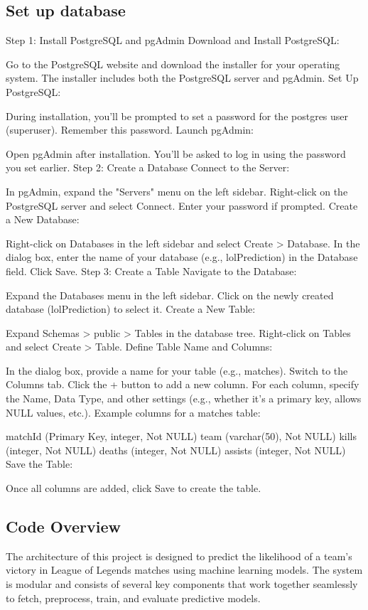 \documentclass[10pt,twocolumn]{article}
\begin{document}
\subsection{Set up database}
Step 1: Install PostgreSQL and pgAdmin
Download and Install PostgreSQL:

Go to the PostgreSQL website and download the installer for your operating system.
The installer includes both the PostgreSQL server and pgAdmin.
Set Up PostgreSQL:

During installation, you'll be prompted to set a password for the postgres user (superuser). Remember this password.
Launch pgAdmin:

Open pgAdmin after installation. You’ll be asked to log in using the password you set earlier.
Step 2: Create a Database
Connect to the Server:

In pgAdmin, expand the "Servers" menu on the left sidebar.
Right-click on the PostgreSQL server and select Connect. Enter your password if prompted.
Create a New Database:

Right-click on Databases in the left sidebar and select Create > Database.
In the dialog box, enter the name of your database (e.g., lolPrediction) in the Database field.
Click Save.
Step 3: Create a Table
Navigate to the Database:

Expand the Databases menu in the left sidebar.
Click on the newly created database (lolPrediction) to select it.
Create a New Table:

Expand Schemas > public > Tables in the database tree.
Right-click on Tables and select Create > Table.
Define Table Name and Columns:

In the dialog box, provide a name for your table (e.g., matches).
Switch to the Columns tab.
Click the + button to add a new column.
For each column, specify the Name, Data Type, and other settings (e.g., whether it’s a primary key, allows NULL values, etc.).
Example columns for a matches table:

matchId (Primary Key, integer, Not NULL)
team (varchar(50), Not NULL)
kills (integer, Not NULL)
deaths (integer, Not NULL)
assists (integer, Not NULL)
Save the Table:

Once all columns are added, click Save to create the table.

\subsection{Code Overview}

The architecture of this project is designed to predict the likelihood of a team’s victory in League of Legends matches using machine learning models. The system is modular and consists of several key components that work together seamlessly to fetch, preprocess, train, and evaluate predictive models.
\end{document}
